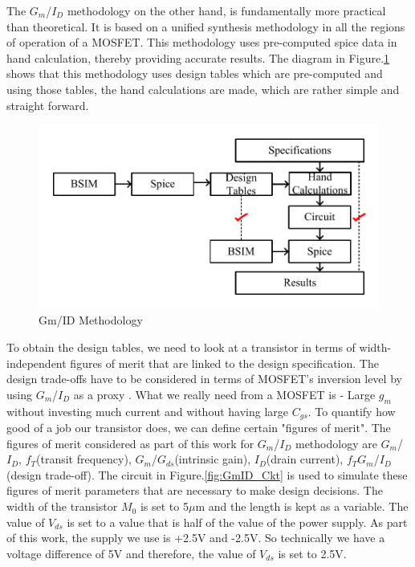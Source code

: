 The $G_m$/$I_D$ methodology on the other hand, is fundamentally more practical than theoretical. It is based on a unified synthesis methodology in all the regions of operation of a MOSFET. This methodology uses pre-computed spice data in hand calculation, thereby providing accurate results. The diagram in Figure.\ref{fig:GmID} shows that this methodology uses design tables which are pre-computed and using those tables, the hand calculations are made, which are rather simple and straight forward. 

\begin{figure} [H]
\centering
\includegraphics[scale=1]{Figures/Misc/PDFs/GmID.pdf}
\caption{Gm/ID Methodology}
\label{fig:GmID}
\end{figure}
To obtain the design tables, we need to look at a transistor in terms of width-independent figures of merit that are linked to the design specification. The design trade-offs have to be considered in terms of MOSFET's inversion level by using $G_m$/$I_D$ as a proxy \cite{gmid_basic}. What we really need from a MOSFET is - Large $g_m$ without investing much current and without having large $C_{gs}$. To quantify how good of a job our transistor does, we can define certain "figures of merit". The figures of merit considered as part of this work for $G_m$/$I_D$ methodology are $G_m$/$I_D$, $f_T$(transit frequency), $G_m$/$G_{ds}$(intrinsic gain), $I_D$(drain current), $f_TG_m$/$I_D$ (design trade-off). The circuit in Figure.\ref{fig:GmID_Ckt} is used to simulate these figures of merit parameters that are necessary to make design decisions. The width of the transistor $M_0$ is set to 5$\mu$m and the length is kept as a variable. The value of $V_{ds}$ is set to a value that is half of the value of the power supply. As part of this work, the supply we use is +2.5V and -2.5V. So technically we have a voltage difference of 5V and therefore, the value of $V_{ds}$ is set to 2.5V. 
